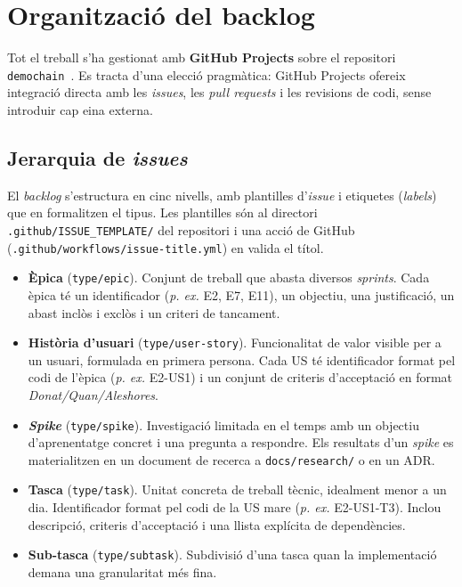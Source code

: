 

\section{Organització del backlog}
\label{sec:backlog}

Tot el treball s'ha gestionat amb \textbf{GitHub Projects} sobre el repositori \texttt{demochain}~\cite{demochainrepo}.
Es tracta d'una elecció pragmàtica: GitHub Projects ofereix integració directa amb les \emph{issues}, les \emph{pull
requests} i les revisions de codi, sense introduir cap eina externa.

\subsection{Jerarquia de \emph{issues}}
\label{subsec:jerarquia}

El \emph{backlog} s'estructura en cinc nivells, amb plantilles d'\emph{issue} i etiquetes (\emph{labels}) que en
formalitzen el tipus.
Les plantilles són al directori \texttt{.github/ISSUE\_TEMPLATE/} del repositori i una acció de GitHub
(\texttt{.github/workflows/issue-title.yml}) en valida el títol.

\begin{itemize}
    \item \textbf{Èpica} (\texttt{type/epic}).
    Conjunt de treball que abasta diversos \emph{sprints}.
    Cada èpica té un identificador (\emph{p.
    ex.} E2, E7, E11), un objectiu, una justificació, un abast inclòs i exclòs i un criteri de tancament.

    \item \textbf{Història d'usuari} (\texttt{type/user-story}).
    Funcionalitat de valor visible per a un usuari, formulada en primera persona.
    Cada \ac{US} té identificador format pel codi de l'èpica (\emph{p.
    ex.} E2-\ac{US}1) i un conjunt de criteris d'acceptació en format \emph{Donat/Quan/Aleshores}.

    \item \textbf{\emph{Spike}} (\texttt{type/spike}).
    Investigació limitada en el temps amb un objectiu d'aprenentatge concret i una pregunta a respondre.
    Els resultats d'un \emph{spike} es materialitzen en un document de recerca a \texttt{docs/research/} o en un
    \ac{ADR}.

    \item \textbf{Tasca} (\texttt{type/task}).
    Unitat concreta de treball tècnic, idealment menor a un dia.
    Identificador format pel codi de la \ac{US} mare (\emph{p.
    ex.} E2-\ac{US}1-T3).
    Inclou descripció, criteris d'acceptació i una llista explícita de dependències.

    \item \textbf{Sub-tasca} (\texttt{type/subtask}).
    Subdivisió d'una tasca quan la implementació demana una granularitat més fina.
\end{itemize}

